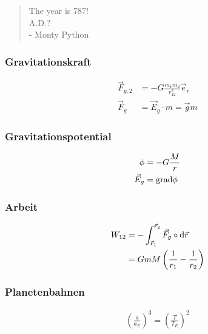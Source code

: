  \begin{quote}
  The year is 787!\\A.D.?\\- Monty Python
 \end{quote}

\begin{multicols}{2}{}
\subsubsection*{Gravitationskraft}
\begin{align*}
\vec{F}_{g,2}&=-G\frac{m_1m_2}{r_{12}^2}\vec{e}_r\\
\vec{F}_g&=\vec{E}_g\cdot m=\vec{g}m
\end{align*}
\hfill

\subsubsection*{Gravitationspotential}
\begin{align*}
\phi&=-G\frac{M}{r}\\
\vec{E}_g&=\mathop{}\!\mathrm{grad}\phi
\end{align*}
\hfill
\end{multicols}

\begin{multicols}{2}{}
\subsubsection*{Arbeit}
\begin{align*}
W_{12}&=-\int_{\vec{r}_1}^{\vec{r}_2}\vec{F}_g\circ\mathop{}\!\mathrm{d}\vec{r}\\
&=GmM\left(\frac{1}{r_1}-\frac{1}{r_2}\right)
\end{align*}

\subsubsection*{Planetenbahnen}
\begin{align*}
\left(\frac{a}{a_E}\right)^3=\left(\frac{T}{T_E}\right)^2
\end{align*}
\hfill
\end{multicols}
